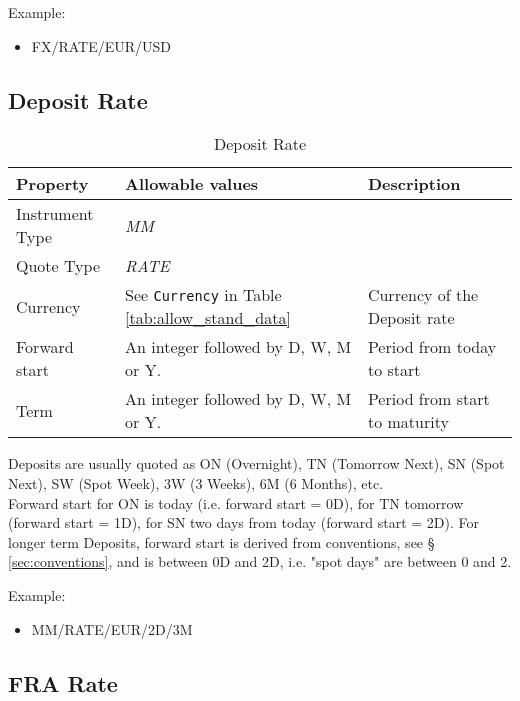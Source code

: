 Example:
\begin{itemize}
\item {FX/RATE/EUR/USD}
\end{itemize}

\subsection{Deposit Rate}

\begin{table}[H]
\centering
  \begin{tabular}{|p{3cm}|p{3.5cm}|p{7cm}|}
  \hline
    {\bf Property} & {\bf Allowable values} & {\bf Description} \\ \hline
    Instrument Type & \emph{MM} & \\ \hline
    Quote Type & \emph{RATE} & \\ \hline
    Currency & See \lstinline!Currency! in Table \ref{tab:allow_stand_data} & Currency of the Deposit rate\\ \hline
    Forward start & An integer followed by D, W, M or Y.  & Period from today to start \\ \hline
    Term & An integer followed by D, W, M or Y. & Period from start to maturity\\ \hline
  \end{tabular}
  \caption{Deposit Rate}
  \label{tab:deposit_quote}
\end{table}


Deposits are usually quoted as ON (Overnight), TN (Tomorrow Next), SN
(Spot Next), SW (Spot Week), 3W (3 Weeks), 6M (6 Months), etc. \\

Forward start for ON is today (i.e. forward start = 0D), for TN tomorrow (forward start = 1D), for SN two days from
today (forward start = 2D). For longer term Deposits, forward start is derived from conventions, see \S
\ref{sec:conventions}, and is between 0D and 2D, i.e. "spot days" are between 0 and 2.

\medskip
Example:
\begin{itemize}
\item {MM/RATE/EUR/2D/3M}
\end{itemize}

\subsection{FRA Rate}

